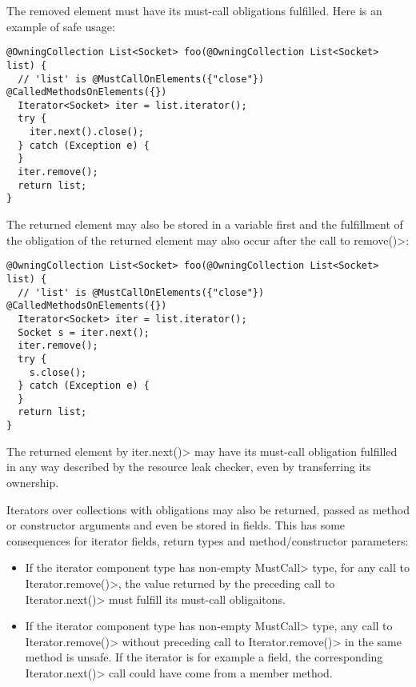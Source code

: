 The removed element must have its must-call obligations fulfilled. Here is an example of safe usage:

\begin{verbatim}
@OwningCollection List<Socket> foo(@OwningCollection List<Socket> list) {
  // 'list' is @MustCallOnElements({"close"}) @CalledMethodsOnElements({})
  Iterator<Socket> iter = list.iterator();
  try {
    iter.next().close();
  } catch (Exception e) {
  }
  iter.remove();
  return list;
}
\end{verbatim}

The returned element may also be stored in a variable first and the fulfillment of the obligation of the returned element may also occur after the call to \<remove()>:

\begin{verbatim}
@OwningCollection List<Socket> foo(@OwningCollection List<Socket> list) {
  // 'list' is @MustCallOnElements({"close"}) @CalledMethodsOnElements({})
  Iterator<Socket> iter = list.iterator();
  Socket s = iter.next();
  iter.remove();
  try {
    s.close();
  } catch (Exception e) {
  }
  return list;
}
\end{verbatim}

The returned element by \<iter.next()> may have its must-call obligation fulfilled in any way described by the resource leak checker, even by transferring its ownership.

Iterators over collections with obligations may also be returned, passed as method or constructor arguments and even be stored in fields. This has some consequences for iterator fields, return types and method/constructor parameters:
\begin{itemize}
  \item If the iterator component type has non-empty \<MustCall> type, for any call to \<Iterator.remove()>, the value returned by the preceding call to \<Iterator.next()> must fulfill its must-call obligaitons.
  \item If the iterator component type has non-empty \<MustCall> type, any call to \<Iterator.remove()> without preceding call to \<Iterator.remove()> in the same method is unsafe. If the iterator is for example a field, the corresponding \<Iterator.next()> call could have come from a member method.
\end{itemize}



